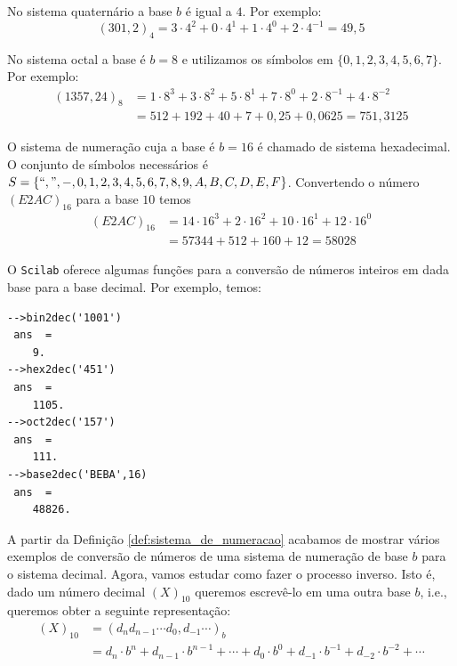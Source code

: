 \begin{ex}
No sistema quaternário a base $b$ é igual a $4$. Por exemplo:
  \begin{equation*}
    (301,2)_{4}=3\cdot 4^2+0\cdot 4^1+1\cdot 4^0+2\cdot 4^{-1}=49,5    
  \end{equation*}
\end{ex}

\begin{ex}
No sistema octal a base é $b=8$ e utilizamos os símbolos em $\{0, 1, 2, 3, 4, 5, 6, 7\}$. Por exemplo:
\begin{equation*}
  \begin{split}
    (1357,24)_{8}&= 1\cdot 8^3+3\cdot 8^2+5\cdot 8^1+7\cdot 8^{0}+2\cdot 8^{-1}+4\cdot 8^{-2}\\
    &= 512+192+40+7+0,25+0,0625=751,3125    
  \end{split}
\end{equation*}
\end{ex}

\begin{ex} O sistema de numeração cuja a base é $b=16$ é chamado de sistema hexadecimal. O conjunto de símbolos necessários é  $S=\{``,", -, 0, 1, 2, 3, 4, 5, 6, 7, 8, 9, A, B, C, D, E, F\}$. Convertendo o número $(E2AC)_{16}$ para a base $10$ temos
\begin{equation*}
  \begin{split}
  (E2AC)_{16} &= 14\cdot 16^3+2\cdot 16^2+10\cdot 16^1+12\cdot 16^{0}\\
  &=57344+512+160+12=58028  
  \end{split}
\end{equation*}
\end{ex}

\ifisscilab
\begin{ex}[Scilab]
  O \verb+Scilab+ oferece algumas funções para a conversão de números inteiros em dada base para a base decimal. Por exemplo, temos:
\begin{verbatim}
-->bin2dec('1001')
 ans  =
    9.  
-->hex2dec('451')
 ans  =
    1105.  
-->oct2dec('157')
 ans  =
    111.
-->base2dec('BEBA',16)
 ans  =
    48826.  
\end{verbatim}
\end{ex}
\fi

A partir da Definição \ref{def:sistema_de_numeracao} acabamos de mostrar vários exemplos de conversão de números de uma sistema de numeração de base $b$ para o sistema decimal. Agora, vamos estudar como fazer o processo inverso. Isto é, dado um número decimal $(X)_{10}$ queremos escrevê-lo em uma outra base $b$, i.e., queremos obter a seguinte representação:
\begin{equation*}
  \begin{split}
    (X)_{10} &= (d_nd_{n-1}\cdots d_0,d_{-1}\cdots)_{b} \\
    &= d_n\cdot b^{n}+d_{n-1}\cdot b^{n-1}+\cdots + d_0\cdot b^0+d_{-1}\cdot b^{-1}+d_{-2}\cdot b^{-2}+\cdots          
  \end{split}
\end{equation*}

